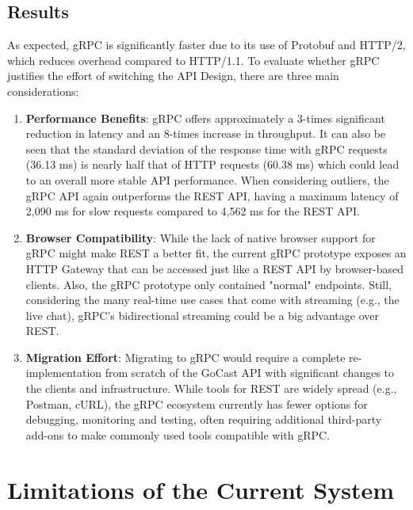 \subsection{Results}

As expected, \ac{gRPC} is significantly faster due to its use of \ac{Protobuf} and HTTP/2, which reduces overhead compared to HTTP/1.1. To evaluate whether \ac{gRPC} justifies the effort of switching the \ac{API} Design, there are three main considerations:

\begin{enumerate}
    \item \textbf{Performance Benefits}: \ac{gRPC} offers approximately a 3-times significant reduction in latency and an 8-times increase in throughput. It can also be seen that the standard deviation of the response time with \ac{gRPC} requests (36.13 ms) is nearly half that of HTTP requests (60.38 ms) which could lead to an overall more stable \ac{API} performance.  When considering outliers, the \ac{gRPC} \ac{API} again outperforms the \ac{REST} \ac{API}, having a maximum latency of 2,090 ms for slow requests compared to 4,562 ms for the \ac{REST} \ac{API}.

    \item \textbf{Browser Compatibility}: While the lack of native browser support for \ac{gRPC} might make \ac{REST} a better fit, the current \ac{gRPC} prototype exposes an HTTP Gateway that can be accessed just like a \ac{REST} \ac{API} by browser-based clients. Also, the \ac{gRPC} prototype only contained "normal" endpoints. Still, considering the many real-time use cases that come with streaming (e.g., the live chat), \ac{gRPC}’s bidirectional streaming could be a big advantage over \ac{REST}.

    \item \textbf{Migration Effort}: Migrating to \ac{gRPC} would require a complete re-implementation from scratch of the GoCast \ac{API} with significant changes to the clients and infrastructure. While tools for \ac{REST} are widely spread (e.g., Postman, cURL), the \ac{gRPC} ecosystem currently has fewer options for debugging, monitoring and testing, often requiring additional third-party add-ons to make commonly used tools compatible with \ac{gRPC}.
\end{enumerate}

\section{Limitations of the Current System}

